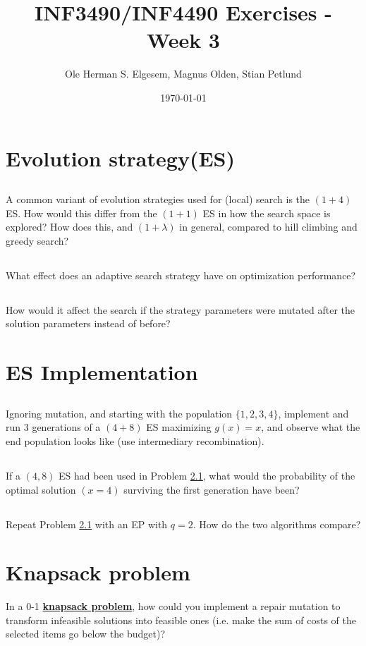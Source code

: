 \documentclass{article}           %
\title{\vspace{-2cm}INF3490/INF4490 Exercises - Week 3}
\author{Ole Herman S. Elgesem, Magnus Olden, Stian Petlund}
\date{\today}
\newcommand\marginsymbol[1][0pt]{%
  \tabto*{0cm}\makebox[\dimexpr-1cm-#1\relax][r]{$\mathbb{P}$}\tabto*{\TabPrevPos}}
\begin{document}
    \renewcommand\marginsymbol[1][0pt]{%
  \tabto*{0cm}\makebox[-1cm][c]{$\mathbb{P}$}\tabto*{\TabPrevPos}}

\maketitle


\section{Evolution strategy(ES)} %
\subsection{} %
A common variant of evolution strategies used for (local) search is the \((1 + 4)\) ES.
How would this differ from the \((1 + 1)\) ES in how the search space is explored?
How does this, and \((1 + \lambda)\) in general, compared to hill climbing and greedy search?
\subsection{} %
What effect does an adaptive search strategy have on optimization performance?
\subsection{} %
How would it affect the search if the strategy parameters were mutated after the solution parameters instead of before?
\section{ES Implementation} %
\subsection{\marginsymbol} %
\label{subsec:w4e3a}
Ignoring mutation, and starting with the population \(\{1, 2, 3, 4\}\),
implement and run 3 generations of a \((4 + 8)\) ES maximizing \(g(x) = x\),
and observe what the end population looks like (use intermediary recombination).
\subsection{} %
If a \((4, 8)\) ES had been used in Problem \ref{subsec:w4e3a},
what would the probability of the optimal solution \((x = 4)\) surviving the first generation have been?
\subsection{\marginsymbol} %
Repeat Problem \ref{subsec:w4e3a} with an EP with \(q = 2\).
How do the two algorithms compare?
\section{Knapsack problem}
In a 0-1 \href{https://en.wikipedia.org/wiki/Knapsack_problem}{\textbf{knapsack problem}},
how could you implement a repair mutation to transform infeasible solutions into feasible ones
(i.e. make the sum of costs of the selected items go below the budget)?


\end{document}
